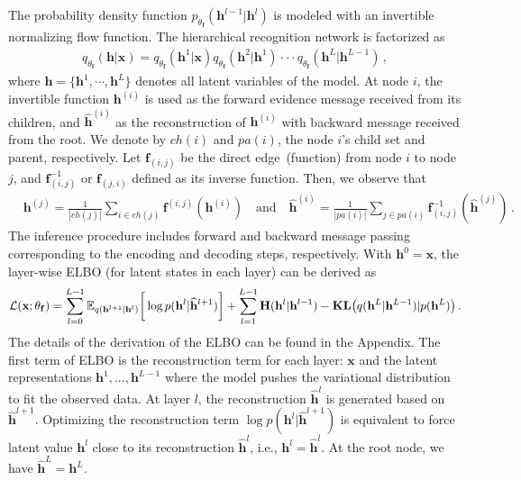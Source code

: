\documentclass{article} %
\begin{document}
The probability density function $p_{\theta_{\mathbf{f}}}(\mathbf{h}^{l-1} | \mathbf{h}^{l})$ is modeled with an invertible normalizing flow function.
The hierarchical recognition network is factorized as
\begin{align*}
q_{\theta_{\mathbf{f}}}(\mathbf{h}| \mathbf{x}) =  q_{\theta_{\mathbf{f}}}(\mathbf{h}^1 | \mathbf{x})  q_{\theta_{\mathbf{f}}}(\mathbf{h}^2 | \mathbf{h}^1) \cdot \cdot  \cdot  q_{\theta_{\mathbf{f}}}(\mathbf{h}^{L} | \mathbf{h}^{L-1}) \, ,
\end{align*}
where $\mathbf{h}=\{\mathbf{h}^1, \cdots, \mathbf{h}^L \}$ denotes all latent variables of the model.
At node $i$, the invertible function $\mathbf{h}^{(i)}$ is used as the forward evidence message received from its children, and $\widehat{\mathbf{h}}^{(i)}$ as the  reconstruction of $\mathbf{h}^{(i)}$ with backward message received from the root. 
We denote by $ch(i)$ and $pa(i)$, the node $i$'s child set and parent, respectively. 
Let $\mathbf{f}_{(i, j)}$ be the direct edge~(function) from node $i$ to node $j$, and $\mathbf{f}^{-1}_{ (i, j)}$ or  $\mathbf{f}_{ (j, i)}$ defined as its inverse function.
 Then, we observe that
\begin{align*}
&  \mathbf{h}^{(j)} = \frac{1}{|ch(j)|} \sum_{i \in ch(j) } \mathbf{f}^{(i,j)}(\mathbf{h}^{(i)})  \quad \textrm{and} \quad \widehat{\mathbf{h}}^{(i)} = \frac{1}{|pa(i)|} \sum_{j \in pa(i) } \mathbf{f}^{-1}_{ (i,j)}(\widehat{\mathbf{h}}^{(j)}) \, .
\end{align*} 
The inference procedure includes forward and backward message passing corresponding to the encoding and decoding steps, respectively. 
With $\mathbf{h}^0 = \mathbf{x}$, the layer-wise ELBO (for latent states in each layer) can be derived as 
\begin{align} \label{eq:elbo_tree}
\mathcal{L}(\mathbf{x}; \theta_{\mathbf{f}}) =  \sum_{l=0}^{L-1}  \mathbb{E}_{q(\mathbf{h}^{l+1}|\mathbf{h}^l)} \bigg[ \log p( \mathbf{h}^{l}|  \widehat{\mathbf{h}}^{l+1})   \bigg] +  \sum_{l=1}^{L-1}   \textbf{\text{H}}(\mathbf{h}^l | \mathbf{h}^{l-1} )   -   \textbf{\text{KL}}\big(q(\mathbf{h}^L | \mathbf{h}^{L-1} )   | p(\mathbf{h}^L)  \big) \, .  
\end{align}
The details of the derivation of the ELBO can be found in the Appendix. 
The first term of ELBO is the reconstruction term for each layer: $\mathbf{x}$ and the latent representations $\mathbf{h}^1, ..., \mathbf{h}^{L-1}$ where the model pushes the variational distribution to fit the observed data.
At layer $l$, the reconstruction $\widehat{\mathbf{h}}^l$ is generated based on $\widehat{\mathbf{h}}^{l+1}$. Optimizing the reconstruction term  $\log p( \mathbf{h}^{l}|  \widehat{\mathbf{h}}^{l+1})$ is equivalent to force latent value $\mathbf{h}^l$ close to its reconstruction $\widehat{\mathbf{h}}^l$, i.e., $\mathbf{h}^l = \widehat{\mathbf{h}}^l$. At the root node, we have $\widehat{\mathbf{h}}^L = \mathbf{h}^L$.
\end{document}
